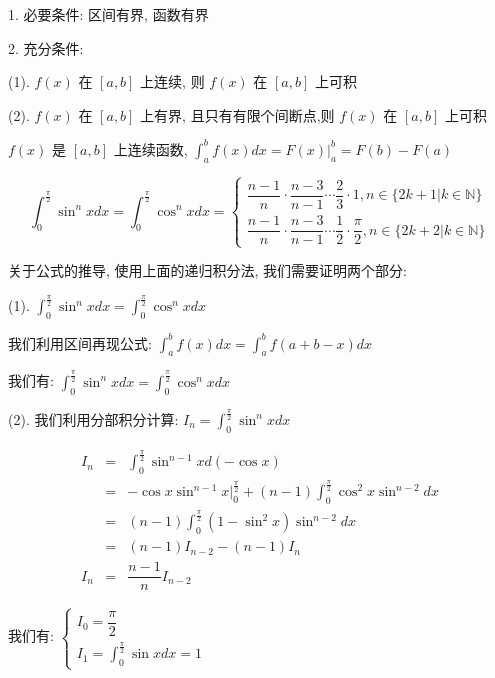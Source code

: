 \begin{theorem}[定积分存在定理]
	1. 必要条件: 区间有界, 函数有界

	2. 充分条件:

	(1). $f(x)$ 在 $[a,b]$ 上连续, 则 $f(x)$ 在 $[a,b]$ 上可积

	(2). $f(x)$ 在 $[a,b]$ 上有界, 且只有有限个间断点,则 $f(x)$ 在 $[a,b]$ 上可积
\end{theorem}
\begin{theorem}[牛顿莱布尼茨公式]
	$f(x)$ 是 $[a,b]$ 上连续函数, $\int_{a}^{b}f(x)dx = F(x)|_{a}^{b} = F(b) - F(a)$
\end{theorem}
\begin{theorem}[华里士公式]
	$$\int_{0}^{\frac{\pi}{2}}\sin^{n}x dx = \int_{0}^{\frac{\pi}{2}}\cos^{n} xdx =
	\begin{cases} 
	\dfrac{n-1}{n}\cdot \dfrac{n-3}{n-1}\cdots \dfrac{2}{3}\cdot 1, n\in \{2k+1|k\in \mathbb{N}\} \\
	\dfrac{n-1}{n}\cdot \dfrac{n-3}{n-1}\cdots \dfrac{1}{2}\cdot \dfrac{\pi}{2}, n\in \{2k+2|k\in \mathbb{N}\}  
	\end{cases}$$

	关于公式的推导, 使用上面的递归积分法, 我们需要证明两个部分:

	(1). $\int_{0}^{\frac{\pi}{2}}\sin^{n}x dx = \int_{0}^{\frac{\pi}{2}}\cos^{n}x dx$

	我们利用区间再现公式: $\int_{a}^{b}f(x)dx = \int_{a}^{b}f(a+b-x) dx$

	我们有: $\int_{0}^{\frac{\pi}{2}}\sin^{n}x dx = \int_{0}^{\frac{\pi}{2}}\cos^{n}x dx$

	(2). 我们利用分部积分计算: $I_{n} = \int_{0}^{\frac{\pi}{2}}\sin^{n} xdx$
	
	\begin{eqnarray*}
		I_{n} &=& \int_{0}^{\frac{\pi}{2}} \sin^{n-1}x d(-\cos x)\\
			  &=& -\cos x\sin^{n-1}x \big|_{0}^{\frac{\pi}{2}} + (n-1)\int_{0}^{\frac{\pi}{2}}\cos^{2}x\sin^{n-2}dx\\
			  &=& (n-1)\int_{0}^{\frac{\pi}{2}}(1-\sin^{2}x)\sin^{n-2}dx\\ 
			  &=& (n-1)I_{n-2} - (n-1)I_{n}\\
		I_{n} &=& \dfrac{n-1}{n}I_{n-2}
	\end{eqnarray*}

	我们有: $\begin{cases} I_{0} = \dfrac{\pi}{2}  \\ I_{1} = \int_{0}^{\frac{\pi}{2}}\sin xdx = 1  \end{cases}$


\end{theorem}
